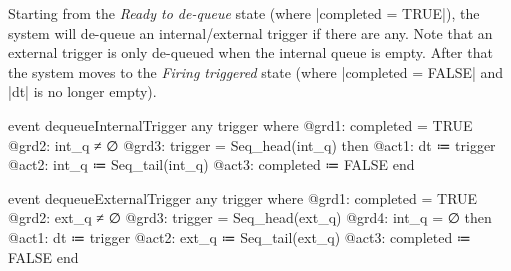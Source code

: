 Starting from the \emph{Ready to de-queue} state (where |completed = TRUE|), the system will de-queue an internal/external trigger if there are any. Note that an external trigger is only de-queued when the internal queue is empty. After that the system moves to the \emph{Firing triggered} state (where |completed = FALSE| and |dt| is no longer empty).
\begin{center}
\begin{minipage}[t]{0.48\textwidth}
\begin{EventBcode}
event dequeueInternalTrigger
any trigger where 
	@grd1: completed = TRUE
	@grd2: int_q ≠ ∅
	@grd3: trigger = Seq_head(int_q)
then 
	@act1: dt ≔ {trigger}
	@act2: int_q ≔ Seq_tail(int_q) 
	@act3: completed ≔ FALSE
end
\end{EventBcode}
\end{minipage}
\hfill
\begin{minipage}[t]{0.48\textwidth}
\begin{EventBcode}
event dequeueExternalTrigger
any trigger where 
    @grd1: completed = TRUE
    @grd2: ext_q ≠ ∅
    @grd3: trigger = Seq_head(ext_q)
    @grd4: int_q = ∅
then 
    @act1: dt ≔ {trigger}
    @act2: ext_q ≔ Seq_tail(ext_q)
    @act3: completed ≔ FALSE
end
\end{EventBcode}
\end{minipage}
\end{center}

